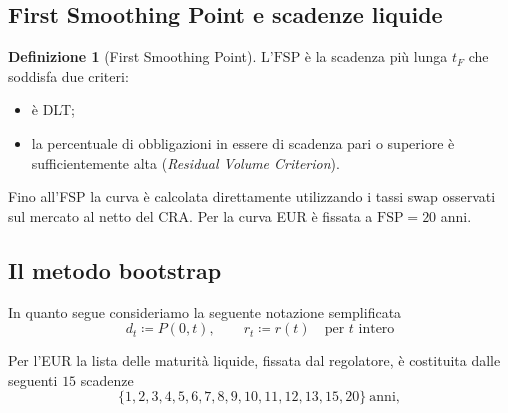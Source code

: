 \documentclass[11pt,a4paper]{article}
\theoremstyle{plain}
\theoremstyle{definition}
\newtheorem{definizione}[teorema]{Definizione}
\theoremstyle{remark}
\newcommand{\FSP}{\mathrm{FSP}}
\newcommand{\defeq}{\coloneqq}
\begin{document}
\subsection{First Smoothing Point e scadenze liquide}
\label{sec:fsp-dlt}

\begin{definizione}[First Smoothing Point]
\label{def:fsp}
L'$\FSP$ \`e la scadenza pi\`u lunga $t_F$ che soddisfa due criteri: \begin{itemize} \item  \`e DLT; \item  la
percentuale di obbligazioni in essere di scadenza pari o superiore \`e sufficientemente alta
(\emph{Residual Volume Criterion}). 
\end{itemize}
Fino all'FSP la curva \`e calcolata direttamente utilizzando i tassi swap osservati sul mercato al netto del CRA. 
Per la curva EUR è fissata a $\FSP=20$ anni.
\end{definizione}


\subsection{Il metodo bootstrap}
\label{sec:bootstrap}

In quanto segue consideriamo la seguente notazione semplificata
\[
  d_t \defeq P(0,t), \qquad r_t \defeq r(t) \quad\text{per } t \text{ intero}
\]

Per l'EUR la lista delle maturit\`a liquide, fissata dal regolatore, \`e costituita dalle seguenti $15$ scadenze
\[
  \{1,2,3,4,5,6,7,8,9,10,11,12,13,15,20\}\ \text{anni},
\]
\end{document}
